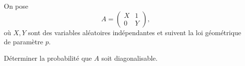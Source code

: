 \begin{enonce}
\begin{exercise}[ID={RMS135 E1495},subtitle={IMT MP 2024},tags={},difficulty={}]

On pose
\begin{equation*}
A = \begin{pmatrix} X & 1 \\ 0 & Y \end{pmatrix},
\end{equation*}
où $X, Y$ sont des variables aléatoires indépendantes et suivent la loi géométrique de paramètre $p$.

Déterminer la probabilité que $A$ soit diagonalisable.
\end{exercise}
\begin{solution}
\end{solution}
\end{enonce}
